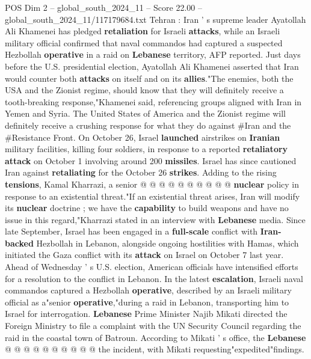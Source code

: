 \begin{textsample}{POS Dim 2 – global\_south\_2024\_11 – Score 22.00 – global\_south\_2024\_11/117179684.txt}  \label{ex:f2_pos_172}
Tehran : Iran ' s supreme leader Ayatollah Ali Khamenei has pledged \textbf{retaliation} for Israeli \textbf{attacks}, while an Israeli military official confirmed that naval commandos had captured a suspected Hezbollah \textbf{operative} in a raid on \textbf{Lebanese} territory, AFP reported.
Just days before the U.S. presidential election, Ayatollah Ali Khamenei asserted that Iran would counter both \textbf{attacks} on itself and on its \textbf{allies}."The enemies, both the USA and the Zionist regime, should know that they will definitely receive a tooth-breaking response,"Khamenei said, referencing groups aligned with Iran in Yemen and Syria.
The United States of America and the Zionist regime will definitely receive a crushing response for what they do against \#Iran and the \#Resistance Front.
On October 26, Israel \textbf{launched} airstrikes on \textbf{Iranian} military facilities, killing four soldiers, in response to a reported \textbf{retaliatory} \textbf{attack} on October 1 involving around 200 \textbf{missiles}.
Israel has since cautioned Iran against \textbf{retaliating} for the October 26 \textbf{strikes}.
Adding to the rising \textbf{tensions}, Kamal Kharrazi, a senior @ @ @ @ @ @ @ @ @ @ \textbf{nuclear} policy in response to an existential threat."If an existential threat arises, Iran will modify its \textbf{nuclear} doctrine ; we have the \textbf{capability} to build weapons and have no issue in this regard,"Kharrazi stated in an interview with \textbf{Lebanese} media.
Since late September, Israel has been engaged in a \textbf{full-scale} conflict with \textbf{Iran-backed} Hezbollah in Lebanon, alongside ongoing hostilities with Hamas, which initiated the Gaza conflict with its \textbf{attack} on Israel on October 7 last year.
Ahead of Wednesday ' s U.S. election, American officials have intensified efforts for a resolution to the conflict in Lebanon.
In the latest \textbf{escalation}, Israeli naval commandos captured a Hezbollah \textbf{operative}, described by an Israeli military official as a"senior \textbf{operative},"during a raid in Lebanon, transporting him to Israel for interrogation. \textbf{Lebanese} Prime Minister Najib Mikati directed the Foreign Ministry to file a complaint with the UN Security Council regarding the raid in the coastal town of Batroun.
According to Mikati ' s office, the \textbf{Lebanese} @ @ @ @ @ @ @ @ @ @ the incident, with Mikati requesting"expedited"findings.

\end{textsample}
